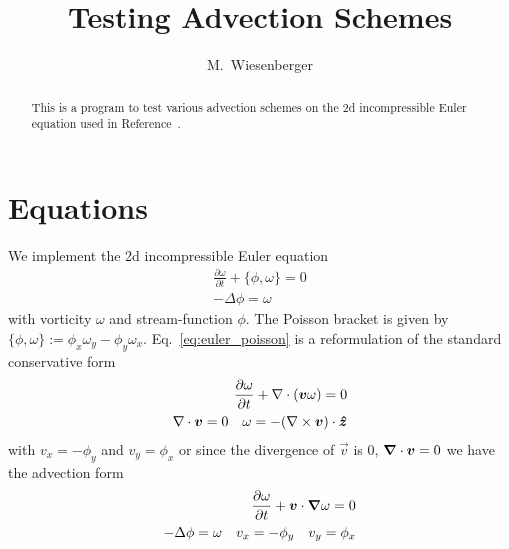 





\title{Testing Advection Schemes}
\author{ M.~Wiesenberger}
\maketitle

\begin{abstract}
  This is a program to test various advection schemes on the 2d incompressible Euler
  equation used in Reference~\cite{Einkemmer2014}.
\end{abstract}

\section{Equations}
We implement the 2d incompressible Euler equation
\begin{subequations}
\begin{align}
 \frac{\partial \omega}{\partial t} + \{ \phi, \omega\} = 0 \\
 -\Delta \phi = \omega \label{eq:euler_poisson_elliptic}
\end{align}
\label{eq:euler_poisson}
\end{subequations}
with vorticity $\omega$ and stream-function $\phi$.
The Poisson bracket is given by $\{ \phi, \omega\} := \phi_x \omega_y - \phi_y \omega_x$.
Eq.~\eqref{eq:euler_poisson} is a reformulation of the standard conservative form
\begin{subequations}
\begin{align}
    \frac{\partial \omega}{\partial t} + \nabla\cdot({{\boldsymbol{v}} \omega}) = 0 \\
\nabla\cdot{\boldsymbol{v}} = 0 \quad \omega = -(\nabla\times {\boldsymbol{v}})\cdot \bm{\hat{z}}
\end{align}
\label{eq:euler_conservative}
\end{subequations}
with $v_x = - \phi_y$ and $v_y = \phi_x$
or since the divergence of $\vec v$ is $0$, ${\boldsymbol{\nabla}}\cdot {\boldsymbol{v}} = 0$ we have the advection form
\begin{subequations}
\begin{align}
    \frac{\partial \omega}{\partial t} + {\boldsymbol{v}}\cdot{\boldsymbol{\nabla}} \omega = 0 \\
    -\Delta\phi = \omega \quad v_x = -\phi_y \quad v_y = \phi_x
\end{align}
\label{eq:euler_advection}
\end{subequations}

